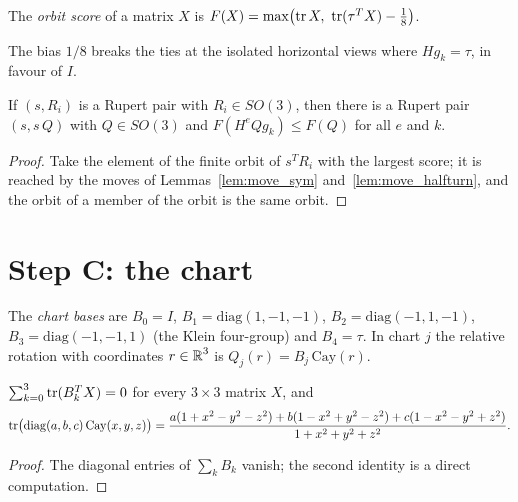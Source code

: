\begin{definition}
\label{def:orbit_score}
\leanok
{}
The \emph{orbit score} of a matrix $X$ is
$F(X) = \max\bigl(\operatorname{\mathrm{tr}} X,\ \operatorname{\mathrm{tr}}(\tau^T X) - \tfrac18\bigr)$.
\end{definition}

The bias $1/8$ breaks the ties at the isolated horizontal views where $H g_k = \tau$, in
favour of $I$.

\begin{lemma}
\label{lem:step_orbit}
\leanok
{}
If $(s, R_i)$ is a Rupert pair with $R_i \in SO(3)$, then there is a Rupert pair
$(s, s\,Q)$ with $Q \in SO(3)$ and $F(H^e Q g_k) \le F(Q)$ for all $e$ and $k$.
\end{lemma}
\begin{proof}
\leanok
Take the element of the finite orbit of $s^T R_i$ with the largest score; it is reached
by the moves of Lemmas~\ref{lem:move_sym} and~\ref{lem:move_halfturn}, and the orbit of
a member of the orbit is the same orbit.
\end{proof}

\section{Step C: the chart}

\begin{definition}
\label{def:charts}
\leanok
{}
The \emph{chart bases} are $B_0 = I$, $B_1 = \mathrm{diag}(1, -1, -1)$,
$B_2 = \mathrm{diag}(-1, 1, -1)$, $B_3 = \mathrm{diag}(-1, -1, 1)$ (the Klein four-group)
and $B_4 = \tau$. In chart $j$ the relative rotation with coordinates $r \in \operatorname{\mathbb{R}}^3$ is
$Q_j(r) = B_j\, \mathrm{Cay}(r)$.
\end{definition}

\begin{lemma}
\label{lem:klein_sum}
\leanok
{}
$\sum_{k=0}^{3} \operatorname{\mathrm{tr}}(B_k^T X) = 0$ for every $3 \times 3$ matrix $X$, and
\[
  \operatorname{\mathrm{tr}}\bigl(\mathrm{diag}(a, b, c)\,\mathrm{Cay}(x, y, z)\bigr) =
  \frac{a(1 + x^2 - y^2 - z^2) + b(1 - x^2 + y^2 - z^2) + c(1 - x^2 - y^2 + z^2)}{1 + x^2 + y^2 + z^2}.
\]
\end{lemma}
\begin{proof}
\leanok
The diagonal entries of $\sum_k B_k$ vanish; the second identity is a direct
computation.
\end{proof}


